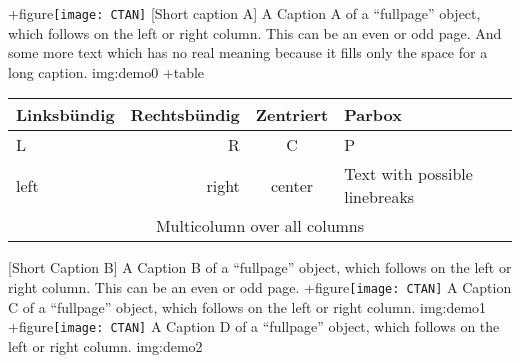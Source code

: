 \documentclass{scrartcl}
\begin{document}
\Float[Multi]
\captionsetup{singlelinecheck=false}
\hvFloat[fullpage,capPos=l,multiFloat]%
  +{figure}{\texttt{[image: CTAN]}}%
   [Short caption A]%
   {A Caption A of a ``fullpage'' object, which follows on the left or
    right column. This can be an even or odd page. And some more text which has no
    real meaning because it fills only the space for a long caption.}%
   {img:demo0}%
  +{table}{\begin{tabular}{lrcp{3cm}}\hline                 %
            Linksbündig & Rechtsbündig & Zentriert & Parbox\\\hline
            L           & R            & C         & P\\
            left        & right        & center    & Text with possible linebreaks\\
            \multicolumn{4}{c}{Multicolumn over all columns}\\\hline
           \end{tabular}}%
   [Short Caption B]%
   {A Caption B of a ``fullpage'' object, which follows on the left or
        right column. This can be an even or odd page.}{}%
  +{figure}{\texttt{[image: CTAN]}}%
   {A Caption C of a ``fullpage'' object, which follows on the left or
      right column.}%
   {img:demo1}
  +{figure}{\texttt{[image: CTAN]}}%
   {A Caption D of a ``fullpage'' object, which follows on the left or
      right column.}%
   {img:demo2}



\blinddocument
\end{document}
